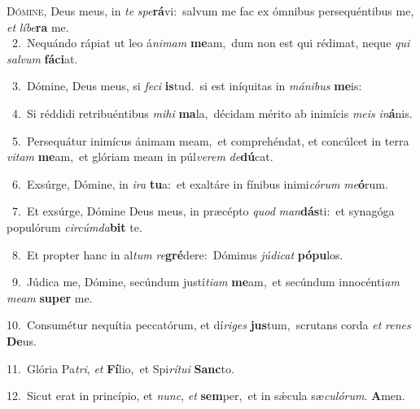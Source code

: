 \lettrine{\initial\textcolor{\initialcolor}{D}}{ómine,} Deus meus, in \textit{te} \textit{spe}\-\textbf{rá}vi:~\star salvum me fac ex ómnibus persequéntibus me, \textit{et} \textit{lí}\-\textit{be}\textbf{ra} me.\\
{\numbfont\textcolor{\numbcolor}{~2.}}~Nequándo rápiat ut leo á\-\textit{ni}\-\textit{mam} \textbf{me}\-am,~\star dum non est qui rédimat, neque \textit{qui} \textit{sal}\-\textit{vum} \textbf{fá}\-\textbf{ci}at.\par
{\numbfont\textcolor{\numbcolor}{~3.}}~Dómine, Deus meus, si \textit{fe}\-\textit{ci} \textbf{is}\-tud.~\star si est iníquitas in \textit{má}\-\textit{ni}\textit{bus} \textbf{me}\-is:\par
{\numbfont\textcolor{\numbcolor}{~4.}}~Si réddidi retribuéntibus \textit{mi}\-\textit{hi} \textbf{ma}\-la,~\star décidam mérito ab inimícis \textit{me}\-\textit{is} \textit{in}\-\textbf{á}nis.\par
{\numbfont\textcolor{\numbcolor}{~5.}}~Persequátur inimícus ánimam meam,~\dagger et comprehéndat, et concúlcet in terra \textit{vi}\-\textit{tam} \textbf{me}\-am,~\star et glóriam meam in púl\-\textit{ve}\-\textit{rem} \textit{de}\-\textbf{dú}cat.\par
{\numbfont\textcolor{\numbcolor}{~6.}}~Exsúrge, Dómine, in \textit{i}\-\textit{ra} \textbf{tu}\-a:~\star et exaltáre in fínibus inimi\-\textit{có}\-\textit{rum} \textit{me}\-\textbf{ó}rum.\par
{\numbfont\textcolor{\numbcolor}{~7.}}~Et exsúrge, Dómine Deus meus, in præcépto \textit{quod} \textit{man}\-\textbf{dás}ti:~\star et synagóga populórum \textit{cir}\-\textit{cúm}\textit{da}\textbf{bit} te.\par
{\numbfont\textcolor{\numbcolor}{~8.}}~Et propter hanc in al\textit{tum} \textit{re}\-\textbf{gré}dere:~\star Dóminus \textit{jú}\-\textit{di}\textit{cat} \textbf{pó}\-\textbf{pu}los.\par
{\numbfont\textcolor{\numbcolor}{~9.}}~Júdica me, Dómine, secúndum justí\-\textit{ti}\-\textit{am} \textbf{me}\-am,~\star et secúndum innocénti\textit{am} \textit{me}\-\textit{am} \textbf{su}\-\textbf{per} me.\par
{\numbfont\textcolor{\numbcolor}{10.}}~Consumétur nequítia peccatórum, et dí\-\textit{ri}\-\textit{ges} \textbf{jus}\-tum,~\star scrutans corda \textit{et} \textit{re}\-\textit{nes} \textbf{De}\-us.\par
{\numbfont\textcolor{\numbcolor}{11.}}~Glória Pa\-\textit{tri}\-, \textit{et} \textbf{Fí}\-lio,~\star et Spi\-\textit{rí}\-\textit{tu}\textit{i} \textbf{Sanc}\-to.\par
{\numbfont\textcolor{\numbcolor}{12.}}~Sicut erat in princípio, et \textit{nunc}\-, \textit{et} \textbf{sem}\-per,~\star et in sǽcula sæ\-\textit{cu}\-\textit{ló}\textit{rum}. \textbf{A}\-men.\par
